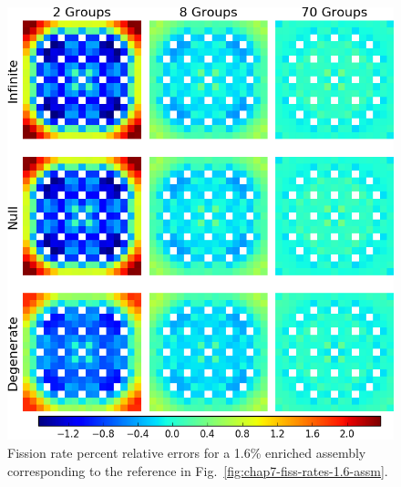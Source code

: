 \begin{appendices}
\begin{figure}[h!]
\centering
\includegraphics[width=\linewidth]{figures/quantification/appendix/assm-16/fiss-err}
\vspace{2mm}
\caption[Fission rate errors for a 1.6\% enriched assembly]{Fission rate percent relative errors for a 1.6\% enriched assembly corresponding to the reference in Fig.~\ref{fig:chap7-fiss-rates-1.6-assm}.}
\label{fig:quantify-assm-1.6-fiss-err}
\end{figure}

\clearpage


\end{appendices}
